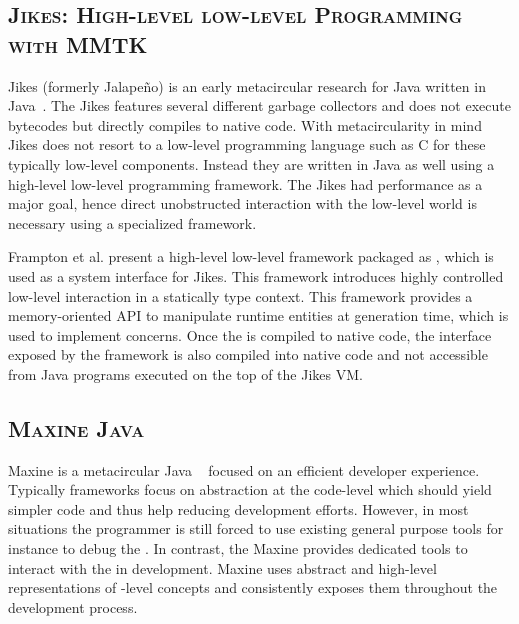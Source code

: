 \subsection*{\textsc{Jikes: High-level low-level Programming with MMTK}}
Jikes (formerly Jalapeño) is an early metacircular research \VM for Java written in Java~\cite{Alpe00a}.
The Jikes \VM features several different garbage collectors and does not execute bytecodes but directly compiles to native code.
With metacircularity in mind Jikes does not resort to a low-level programming language such as C for these typically low-level \VM components.
Instead they are written in Java as well using a high-level low-level programming framework.
The Jikes \VM had performance as a major goal, hence direct unobstructed interaction with the low-level world is necessary using a specialized framework.

Frampton et al. present a high-level low-level framework packaged as , which is used as a system interface for Jikes. This framework introduces highly controlled low-level interaction in a statically type context. This framework provides a memory-oriented API to manipulate runtime entities at \VM generation time, which is used to implement \VM concerns. Once the \VM is compiled to native code, the interface exposed by the  framework is also compiled into native code and not accessible from Java programs executed on the top of the Jikes VM.


\subsection*{\textsc{Maxine Java \VM}}
Maxine is a metacircular Java \VM~\cite{Wimm13a} focused on an efficient developer experience.
Typically \VM frameworks focus on abstraction at the code-level which should yield simpler code and thus help reducing development efforts.
However, in most situations the programmer is still forced to use existing general purpose tools for instance to debug the \VM.
In contrast, the Maxine \VM provides dedicated tools to interact with the \VM in development.
Maxine uses abstract and high-level representations of \VM-level concepts and consistently exposes them throughout the development process.

